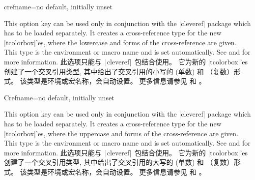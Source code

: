 \begin{newTcbKey}[][doc updated=2014-12-01]{crefname}{=}{no default, initially unset}
\begin{stripedbox}
This option key can be used only in conjunction with the |cleveref| package
which has to be loaded separately.
It creates a cross-reference type for the new |tcolorbox|'es, where the
lowercase  and  forms of the cross-reference are given.
This type is the environment or macro name and  is set automatically.
See  and \cite{cubitt:2018a} 
for more information.
\tcblower
此选项只能与~|cleveref|~包结合使用。%
它为新的 |tcolorbox|'es 创建了一个交叉引用类型, %
其中给出了交叉引用的小写的 (单数) 和 （复数）形式。%
该类型是环境或宏名称，会自动设置。%
更多信息请参见  和 \cite{cubitt:2018a}。
\end{stripedbox}
\end{newTcbKey}

\begin{newTcbKey}[][doc updated=2014-12-01]{Crefname}{=}{no default, initially unset}
\begin{stripedbox}
This option key can be used only in conjunction with the |cleveref| package
\cite{cubitt:2018a} which has to be loaded separately.
It creates a cross-reference type for the new |tcolorbox|'es, where the
uppercase  and  forms of the cross-reference are given.
This type is the environment or macro name and  is set automatically.
See  and \cite{cubitt:2018a} for more information.
\tcblower
此选项只能与~|cleveref|~包结合使用。%
它为新的 |tcolorbox|'es 创建了一个交叉引用类型, %
其中给出了交叉引用的大写的 (单数) 和 （复数）形式。%
该类型是环境或宏名称，会自动设置。%
更多信息请参见  和 \cite{cubitt:2018a}。
\end{stripedbox}
\end{newTcbKey}

